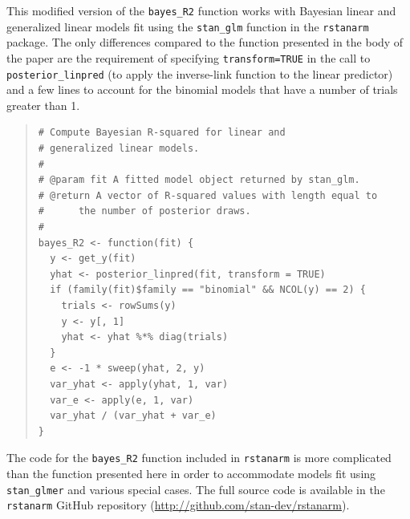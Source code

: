 \documentclass[11pt]{article}
\begin{document}
This modified version of the \verb#bayes_R2# function works with
Bayesian linear and generalized linear models fit using the
\verb#stan_glm# function in the {\tt rstanarm} package. The only
differences compared to the function presented in the body of the paper are
the requirement of specifying \verb#transform=TRUE# in the call to
\verb#posterior_linpred# (to apply the inverse-link function to the linear
predictor) and a few lines to account for the binomial models that
have a number of trials greater than 1.
%
\vspace{-\baselineskip}
\begin{quotation}
\noindent
\begin{small}
\begin{verbatim}
# Compute Bayesian R-squared for linear and
# generalized linear models.
#
# @param fit A fitted model object returned by stan_glm.
# @return A vector of R-squared values with length equal to
#      the number of posterior draws.
#
bayes_R2 <- function(fit) {
  y <- get_y(fit)
  yhat <- posterior_linpred(fit, transform = TRUE)
  if (family(fit)$family == "binomial" && NCOL(y) == 2) {
    trials <- rowSums(y)
    y <- y[, 1]
    yhat <- yhat %*% diag(trials)
  }
  e <- -1 * sweep(yhat, 2, y)
  var_yhat <- apply(yhat, 1, var)
  var_e <- apply(e, 1, var)
  var_yhat / (var_yhat + var_e)
}
\end{verbatim}
\end{small}
\end{quotation}

\noindent The code for the \verb#bayes_R2# function included in {\tt rstanarm}
is more complicated than the function presented here in order to
accommodate models fit using \verb#stan_glmer# and various special cases.
The full source code is available in the {\tt rstanarm} GitHub repository
(\url{http://github.com/stan-dev/rstanarm}).
\end{document}
